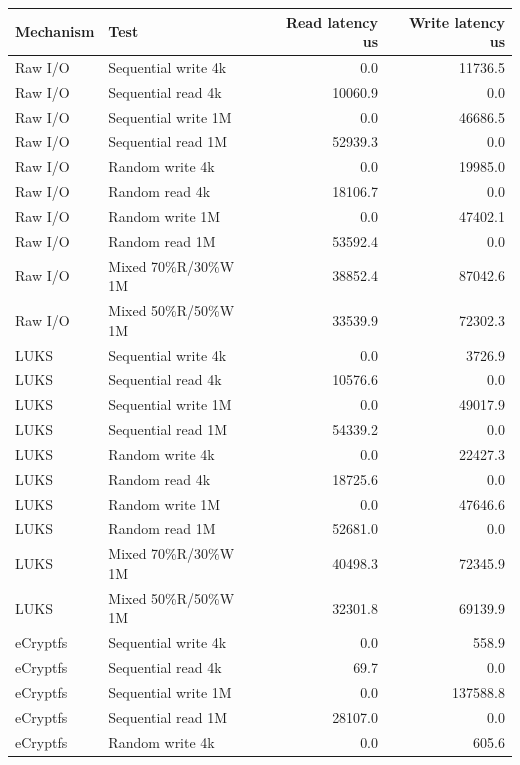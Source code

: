 \documentclass[a4paper]{article}
\begin{document}
\begin{table}[H]
    \centering
    \small
    \begin{tabular}{|l|l|r|r|}
        \hline
        Mechanism & Test & Read latency us & Write latency us \\
        \hline
        Raw I/O & Sequential write 4k & 0.0 & 11736.5 \\
        Raw I/O & Sequential read 4k & 10060.9 & 0.0 \\
        Raw I/O & Sequential write 1M & 0.0 & 46686.5 \\
        Raw I/O & Sequential read 1M & 52939.3 & 0.0 \\
        Raw I/O & Random write 4k & 0.0 & 19985.0 \\
        Raw I/O & Random read 4k & 18106.7 & 0.0 \\
        Raw I/O & Random write 1M & 0.0 & 47402.1 \\
        Raw I/O & Random read 1M & 53592.4 & 0.0 \\
        Raw I/O & Mixed 70\%R/30\%W 1M & 38852.4 & 87042.6 \\
        Raw I/O & Mixed 50\%R/50\%W 1M & 33539.9 & 72302.3 \\
        LUKS & Sequential write 4k & 0.0 & 3726.9 \\
        LUKS & Sequential read 4k & 10576.6 & 0.0 \\
        LUKS & Sequential write 1M & 0.0 & 49017.9 \\
        LUKS & Sequential read 1M & 54339.2 & 0.0 \\
        LUKS & Random write 4k & 0.0 & 22427.3 \\
        LUKS & Random read 4k & 18725.6 & 0.0 \\
        LUKS & Random write 1M & 0.0 & 47646.6 \\
        LUKS & Random read 1M & 52681.0 & 0.0 \\
        LUKS & Mixed 70\%R/30\%W 1M & 40498.3 & 72345.9 \\
        LUKS & Mixed 50\%R/50\%W 1M & 32301.8 & 69139.9 \\
        eCryptfs & Sequential write 4k  & 0.0 & 558.9 \\
        eCryptfs & Sequential read 4k  & 69.7 & 0.0 \\
        eCryptfs & Sequential write 1M  & 0.0 & 137588.8 \\
        eCryptfs & Sequential read 1M  & 28107.0 & 0.0 \\
        eCryptfs & Random write 4k  & 0.0 & 605.6 \\

\end{tabular}
\end{table}
\end{document}
